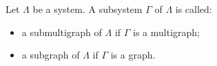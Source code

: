 Let $\Lambda$ be a system. A subsystem $\Gamma$ of $\Lambda$ is called:
\begin{itemize}
\item a submultigraph of $\Lambda$ if $\Gamma$ is a multigraph;
\item a subgraph of $\Lambda$ if $\Gamma$ is a graph.
\end{itemize}
